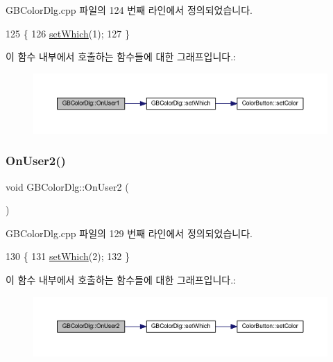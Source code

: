 G\+B\+Color\+Dlg.\+cpp 파일의 124 번째 라인에서 정의되었습니다.


\begin{DoxyCode}
125 \{
126   \mbox{\hyperlink{class_g_b_color_dlg_a1e00eaaeaf344a830f1dd5692e26af1d}{setWhich}}(1);  
127 \}
\end{DoxyCode}
이 함수 내부에서 호출하는 함수들에 대한 그래프입니다.\+:
\nopagebreak
\begin{figure}[H]
\begin{center}
\leavevmode
\includegraphics[width=350pt]{class_g_b_color_dlg_a2648ec830505581e9268be52c4136df6_cgraph}
\end{center}
\end{figure}
\mbox{\label{class_g_b_color_dlg_a932281a7e5ed6c1e816dff7403d1ee2e}} 
\subsubsection{\texorpdfstring{On\+User2()}{OnUser2()}}
{\footnotesize\ttfamily void G\+B\+Color\+Dlg\+::\+On\+User2 (\begin{DoxyParamCaption}{ }\end{DoxyParamCaption})\hspace{0.3cm}{\ttfamily [protected]}}



G\+B\+Color\+Dlg.\+cpp 파일의 129 번째 라인에서 정의되었습니다.


\begin{DoxyCode}
130 \{
131   \mbox{\hyperlink{class_g_b_color_dlg_a1e00eaaeaf344a830f1dd5692e26af1d}{setWhich}}(2);  
132 \}
\end{DoxyCode}
이 함수 내부에서 호출하는 함수들에 대한 그래프입니다.\+:
\nopagebreak
\begin{figure}[H]
\begin{center}
\leavevmode
\includegraphics[width=350pt]{class_g_b_color_dlg_a932281a7e5ed6c1e816dff7403d1ee2e_cgraph}
\end{center}
\end{figure}
\mbox{\label{class_g_b_color_dlg_a1e00eaaeaf344a830f1dd5692e26af1d}} 
